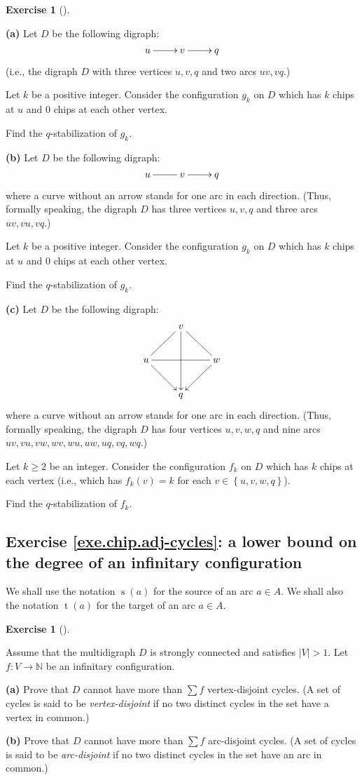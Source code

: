 \documentclass[numbers=enddot,12pt,final,onecolumn,notitlepage]{scrartcl}%
\makeatletter
\newcounter{exer}
\theoremstyle{definition}
\newtheorem{exmp}[exer]{Exercise}
\newenvironment{exercise}[1][]
{\begin{exmp}[#1]\begin{leftbar}}
{\end{leftbar}\end{exmp}}
\let\sumnonlimits\sum
\renewcommand{\sum}{\sumnonlimits\limits}
\newcommand{\NN}{\mathbb{N}}
\newcommand{\set}[1]{\left\{ #1 \right\}}
\newcommand{\abs}[1]{\left| #1 \right|}
\newcommand{\tup}[1]{\left( #1 \right)}
\newcommand{\are}{\ar@{-}}
\makeatother
\begin{document}
\Needspace{15cm}
\begin{exercise} \label{exe.chip.examples}
\textbf{(a)} Let $D$ be the following digraph:
\[
\xymatrix{
 u \ar[r] & v \ar[r] & q
}
\]
(i.e., the digraph $D$ with three vertices
$u, v, q$ and two arcs $uv, vq$.)

Let $k$ be a positive integer.
Consider the configuration $g_k$ on $D$ which has $k$ chips at $u$
and $0$ chips at each other vertex.

Find the $q$-stabilization of $g_k$.

\textbf{(b)} Let $D$ be the following digraph:
\[
\xymatrix{
 u \are[r] & v \ar[r] & q
}
\]
where a curve without an arrow stands for one arc in each
direction.
(Thus, formally speaking, the digraph $D$ has three vertices
$u, v, q$ and three arcs $uv, vu, vq$.)

Let $k$ be a positive integer.
Consider the configuration $g_k$ on $D$ which has $k$ chips at $u$
and $0$ chips at each other vertex.

Find the $q$-stabilization of $g_k$.

\textbf{(c)} Let $D$ be the following digraph:
\[
\xymatrix{
 & v \are[dl] \are[dr] \ar[dd] \\
 u \are[rr] \ar[dr] & & w \ar[dl] \\
 & q
}
\]
where a curve without an arrow stands for one arc in each
direction.
(Thus, formally speaking, the digraph $D$ has four vertices
$u, v, w, q$ and nine arcs
$uv, vu, vw, wv, wu, uw, uq, vq, wq$.)

Let $k \geq 2$ be an integer.
Consider the configuration $f_k$ on $D$ which has $k$ chips at each
vertex (i.e., which has $f_k \tup{v} = k$ for each
$v \in \set{u, v, w, q}$).

Find the $q$-stabilization of $f_k$.
\end{exercise}

\subsection{Exercise \ref{exe.chip.adj-cycles}: a lower bound
on the degree of an infinitary configuration}

We shall use the notation
$\operatorname{s}\tup{a}$ for the source of an arc
$a \in A$.
We shall also the notation
$\operatorname{t}\tup{a}$ for the target of an arc
$a \in A$.

\begin{exercise} \label{exe.chip.adj-cycles}
Assume that the multidigraph $D$ is strongly connected
and satisfies $\abs{V} > 1$.
Let $f : V \to \NN$ be an infinitary configuration.

\textbf{(a)} Prove that $D$ cannot have more than
$\sum f$ vertex-disjoint cycles.
(A set of cycles is said to be \textit{vertex-disjoint}
if no two distinct cycles in the set have a vertex in
common.)

\textbf{(b)} Prove that $D$ cannot have more than
$\sum f$ arc-disjoint cycles.
(A set of cycles is said to be \textit{arc-disjoint}
if no two distinct cycles in the set have an arc in
common.)
\end{exercise}
\end{document}
